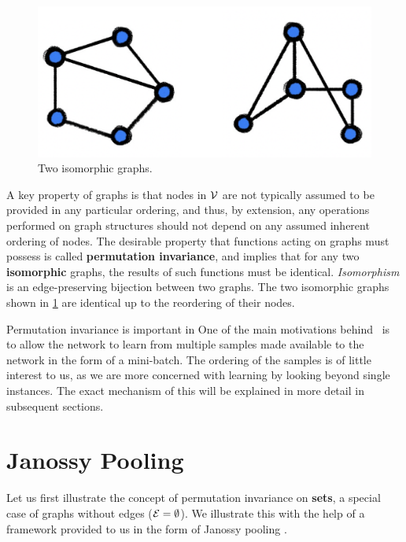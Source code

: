 \begin{figure}
    \centering
    \includegraphics[scale=0.15]{chapters/assets/graph-figs/mn_isomorphic.png}
    \caption{Two isomorphic graphs.}
    \label{fig:graph-isomorphism}
\end{figure}
A key property of graphs is that nodes in $\mathcal{V}$ are not typically assumed to be provided in any particular ordering, and thus, by extension, any operations performed on graph structures should not depend on any assumed inherent ordering of nodes. The desirable property that functions acting on graphs must possess is called \textbf{permutation invariance}, and implies that for any two \textbf{isomorphic} graphs, the results of such functions must be identical. {\em Isomorphism} is an edge-preserving bijection between two graphs. The two isomorphic graphs shown in \cref{fig:graph-isomorphism} are identical up to the reordering of their nodes.

Permutation invariance is important in  One of the main motivations behind \samptr\ is to allow the network to learn from multiple samples made available to the network in the form of a mini-batch. The ordering of the samples is of little interest to us, as we are more concerned with learning by looking beyond single instances. The exact mechanism of this will be explained in more detail in subsequent sections.



\section{Janossy Pooling}\label{sec:janossy-pooling}
Let us first illustrate the concept of permutation invariance on \textbf{sets}, a special case of graphs without edges ($\mathcal{E}=\emptyset$). We illustrate this with the help of a framework provided to us in the form of Janossy pooling \parencite{Murphy2018}.

